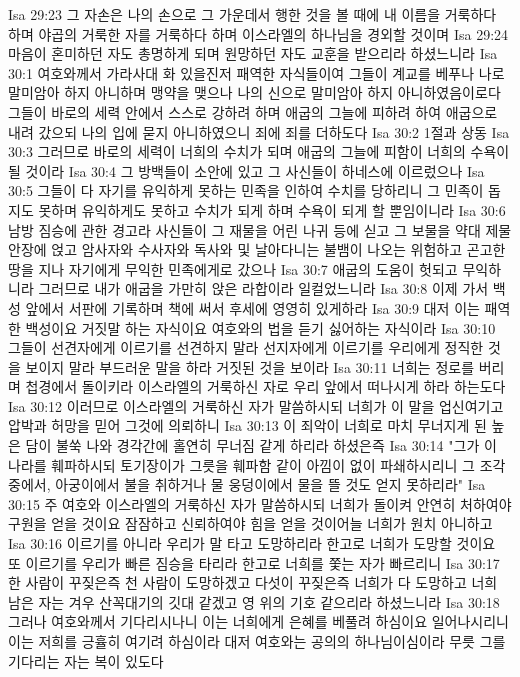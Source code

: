 Isa 29:23  그 자손은 나의 손으로 그 가운데서 행한 것을 볼 때에 내 이름을 거룩하다 하며 야곱의 거룩한 자를 거룩하다 하며 이스라엘의 하나님을 경외할 것이며
Isa 29:24  마음이 혼미하던 자도 총명하게 되며 원망하던 자도 교훈을 받으리라 하셨느니라
Isa 30:1  여호와께서 가라사대 화 있을진저 패역한 자식들이여 그들이 계교를 베푸나 나로 말미암아 하지 아니하며 맹약을 맺으나 나의 신으로 말미암아 하지 아니하였음이로다 그들이 바로의 세력 안에서 스스로 강하려 하며 애굽의 그늘에 피하려 하여 애굽으로 내려 갔으되 나의 입에 묻지 아니하였으니 죄에 죄를 더하도다
Isa 30:2  1절과 상동
Isa 30:3  그러므로 바로의 세력이 너희의 수치가 되며 애굽의 그늘에 피함이 너희의 수욕이 될 것이라
Isa 30:4  그 방백들이 소안에 있고 그 사신들이 하네스에 이르렀으나
Isa 30:5  그들이 다 자기를 유익하게 못하는 민족을 인하여 수치를 당하리니 그 민족이 돕지도 못하며 유익하게도 못하고 수치가 되게 하며 수욕이 되게 할 뿐임이니라
Isa 30:6  남방 짐승에 관한 경고라 사신들이 그 재물을 어린 나귀 등에 싣고 그 보물을 약대 제물 안장에 얹고 암사자와 수사자와 독사와 및 날아다니는 불뱀이 나오는 위험하고 곤고한 땅을 지나 자기에게 무익한 민족에게로 갔으나
Isa 30:7  애굽의 도움이 헛되고 무익하니라 그러므로 내가 애굽을 가만히 앉은 라합이라 일컬었느니라
Isa 30:8  이제 가서 백성 앞에서 서판에 기록하며 책에 써서 후세에 영영히 있게하라
Isa 30:9  대저 이는 패역한 백성이요 거짓말 하는 자식이요 여호와의 법을 듣기 싫어하는 자식이라
Isa 30:10  그들이 선견자에게 이르기를 선견하지 말라 선지자에게 이르기를 우리에게 정직한 것을 보이지 말라 부드러운 말을 하라 거짓된 것을 보이라
Isa 30:11  너희는 정로를 버리며 첩경에서 돌이키라 이스라엘의 거룩하신 자로 우리 앞에서 떠나시게 하라 하는도다
Isa 30:12  이러므로 이스라엘의 거룩하신 자가 말씀하시되 너희가 이 말을 업신여기고 압박과 허망을 믿어 그것에 의뢰하니
Isa 30:13  이 죄악이 너희로 마치 무너지게 된 높은 담이 불쑥 나와 경각간에 홀연히 무너짐 같게 하리라 하셨은즉
Isa 30:14  "그가 이 나라를 훼파하시되 토기장이가 그릇을 훼파함 같이 아낌이 없이 파쇄하시리니 그 조각 중에서, 아궁이에서 불을 취하거나 물 웅덩이에서 물을 뜰 것도 얻지 못하리라"
Isa 30:15  주 여호와 이스라엘의 거룩하신 자가 말씀하시되 너희가 돌이켜 안연히 처하여야 구원을 얻을 것이요 잠잠하고 신뢰하여야 힘을 얻을 것이어늘 너희가 원치 아니하고
Isa 30:16  이르기를 아니라 우리가 말 타고 도망하리라 한고로 너희가 도망할 것이요 또 이르기를 우리가 빠른 짐승을 타리라 한고로 너희를 쫓는 자가 빠르리니
Isa 30:17  한 사람이 꾸짖은즉 천 사람이 도망하겠고 다섯이 꾸짖은즉 너희가 다 도망하고 너희 남은 자는 겨우 산꼭대기의 깃대 같겠고 영 위의 기호 같으리라 하셨느니라
Isa 30:18  그러나 여호와께서 기다리시나니 이는 너희에게 은혜를 베풀려 하심이요 일어나시리니 이는 저희를 긍휼히 여기려 하심이라 대저 여호와는 공의의 하나님이심이라 무릇 그를 기다리는 자는 복이 있도다
